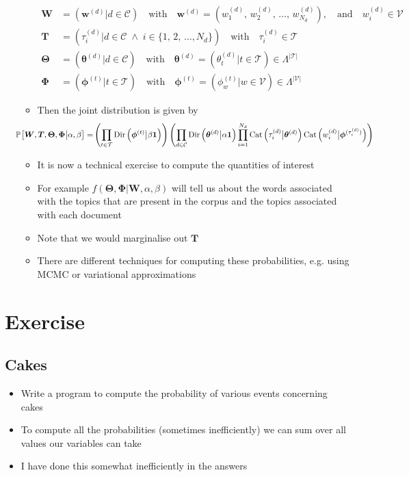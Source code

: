 \documentclass[11pt]{article}
\newcommand{\Prob}[2][]{\mathbb{P}_{#1\!}\left[ #2 \right]}
\newcommand{\Dist}[2][Binom]{\mathrm{#1}\left( \strut {#2} \right)}
\begin{document}
\begin{itemize}
\begin{itemize}
\begin{align*}
 \bm{W} &= (\bm{w}^{(d)} | d\in\mathcal{C})\quad \text{with} \quad
 \bm{w}^{(d)}=(w_1^{(d)},\, w_2^{(d)},\, \ldots,\, w_{N_d}^{(d)}),
 \quad \text{and}\quad w_i^{(d)} \in \mathcal{V} \\
  \bm{T} &= (\tau^{(d)}_i | d\in\mathcal{C}\;\wedge\;
   i\in\{1,\,2,\,\ldots, N_d\})\quad \text{with} \quad \tau^{(d)}_i \in
   \mathcal{T} \\
  \bm{\Theta} &=(\bm{\theta}^{(d)} | d\in\mathcal{C})\quad \text{with}
   \quad \bm{\theta}^{(d)} = (\theta^{(d)}_t | t \in \mathcal{T})\in
  \Lambda^{|\mathcal{T}|} \\
  \bm{\Phi} &= (\bm{\phi}^{(t)} | t \in \mathcal{T}) \quad \text{with}
 \quad \bm{\phi}^{(t)} = (\phi^{(t)}_w | w \in \mathcal{V}) \in
 \Lambda^{|\mathcal{V}|}
\end{align*}
\item Then the joint distribution is given by
\begin{align*}
\hspace{-1cm}        \Prob{\bm{W},\bm{T},\bm{\Theta},\bm{\Phi}\big|\alpha,\beta} =
 & \left(\prod_{t\in\mathcal{T}} \Dist[Dir]{\bm{\phi}^{(t)}\big|\beta\bm{1}}\right)
  \Biggl(\prod_{d\in\mathcal{C}} \Dist[Dir]{\bm{\theta}^{(d)}\big|\alpha\bm{1}}
  \prod_{i=1}^{N_d} \Dist[Cat]{\tau_i^{(d)}\big| \bm{\theta}^{(d)}}
  \Dist[Cat]{w_i^{(d)} \big| \bm{\phi}^{(\tau_i^{(d)})}}\Biggr)
  \end{align*}
\item It is now a technical exercise to compute the quantities of interest
\item For example \(f(\bm{\Theta},\bm{\Phi}|\bm{W},\alpha,\beta)\) will
tell us about the words associated with the topics that are
present in the corpus and the topics associated with each document
\item Note that we would marginalise out \(\bm{T}\)
\item There are different techniques for computing these
probabilities, e.g. using MCMC or variational approximations
\end{itemize}
\end{itemize}



\section{Exercise}
\label{sec:org2682070}

\subsection{Cakes \label{sec:exCakes}}
\label{sec:org3e842ab}
\begin{itemize}
\item Write a program to compute the probability of various events
concerning cakes
\item To compute all the probabilities (sometimes inefficiently) we can
sum over all values our variables can take
\item I have done this somewhat inefficiently in the answers
\end{itemize}
\end{document}
